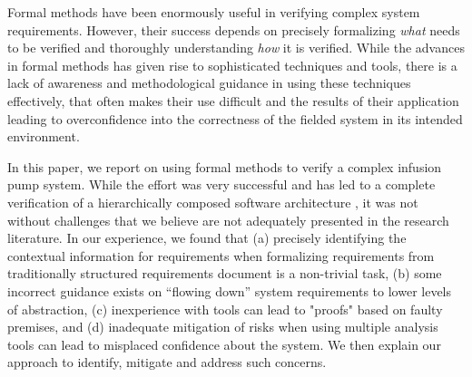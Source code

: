 Formal methods have been enormously useful in verifying complex system requirements. However, their success depends on precisely formalizing {\em what} needs to be verified and thoroughly understanding {\em how} it is verified. While the advances in formal methods has given rise to sophisticated techniques and tools, there is a lack of awareness and methodological guidance in using these techniques effectively, that often makes their use difficult and the results of their application leading to overconfidence into the correctness of the fielded system in its intended environment.

In this paper, we report on using formal methods to verify a complex infusion pump system.  While the effort was very successful and has led to a complete verification of a hierarchically composed software architecture%
, it was not without challenges that we believe are not adequately presented in the research literature. In our experience, we found that (a) precisely identifying the contextual information for requirements when formalizing requirements from traditionally structured requirements document is a non-trivial task, (b) some incorrect guidance exists on ``flowing down'' system requirements to lower levels of abstraction, (c) inexperience with tools can lead to "proofs" based on faulty premises, and (d) inadequate mitigation of risks when using multiple analysis tools can lead to misplaced confidence about the system. We then explain our approach to identify, mitigate and address such concerns.

%

